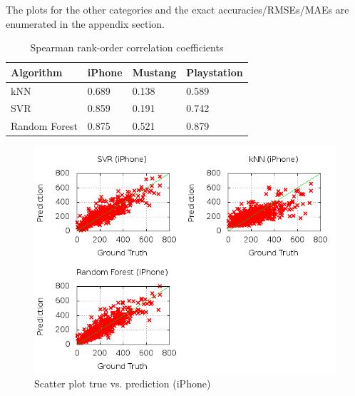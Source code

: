 The plots for the other categories and the exact accuracies/RMSEs/MAEs are enumerated in the appendix section.
\begin{table}[h!]
	\begin{center}
	\begin{tabular}{| p{3.25cm} | p{3.25cm} | p{3.25cm} | p{3.25cm} |}
		\hline
		\textbf{Algorithm} & \textbf{iPhone} & \textbf{Mustang} & \textbf{Playstation} \\
		\hline
		kNN & 0.689 & 0.138 & 0.589 \\
		\hline
		SVR & 0.859 & 0.191 & 0.742 \\
		\hline
		Random Forest & 0.875 & 0.521 & 0.879 \\
		\hline
	\end{tabular}
	\end{center}
	\caption{Spearman rank-order correlation coefficients}
	\label{tab:corr}
\end{table}
\begin{figure}
\centering
\includegraphics[scale=0.55]{images/plots/machine_learning/iphone/true_pred_iphone.png}
\caption{Scatter plot true vs. prediction (iPhone)}
\label{true_predict_iphone}
\end{figure}
